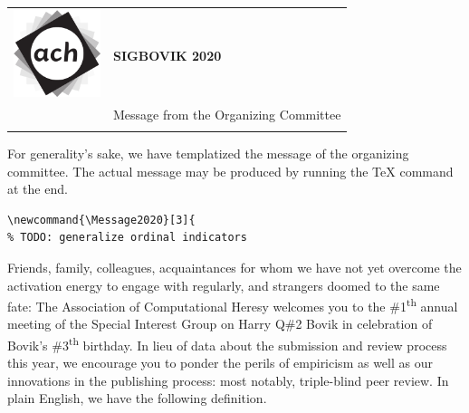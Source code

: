\documentclass[12pt]{article}
\begin{document}
{\sffamily
\begin{tabular}{ll}
\multirow{3}{*}{\includegraphics[width=1in]{ach.png}}\\
& \textbf{\Huge{SIGBOVIK 2020}} \\ &\\
& \LARGE{Message from the Organizing Committee} \\
&\\
\hline
\end{tabular}}
\vspace{2em}
\thispagestyle{empty}

For generality’s sake, we have templatized the message of the organizing committee. The actual message may be produced by running the TeX command at the end.

\begin{verbatim}
\newcommand{\Message2020}[3]{
% TODO: generalize ordinal indicators
\end{verbatim}
Friends, family, colleagues, acquaintances for whom we have not yet overcome the activation energy to engage with regularly, and strangers doomed to the same fate: The Association of Computational Heresy welcomes you to the \#1\textsuperscript{th} annual meeting of the Special Interest Group on Harry Q\#2 Bovik in celebration of Bovik’s \#3\textsuperscript{th} birthday. In lieu of data about the submission and review process this year, we encourage you to ponder the perils of empiricism as well as our innovations in the publishing process: most notably, triple-blind peer review. In plain English, we have the following definition.\\
\end{document}
